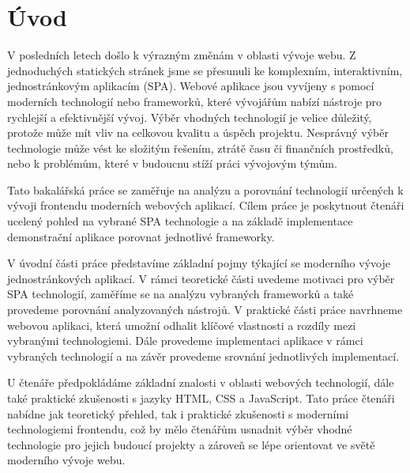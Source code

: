 \section*{Úvod}

\begin{zvyraznenyodstavec}
V posledních letech došlo k výrazným změnám v oblasti vývoje webu. 
Z jednoduchých statických stránek jsme se přesunuli ke komplexním, interaktivním, jednostránkovým aplikacím (SPA). 
Webové aplikace jsou vyvíjeny s pomocí moderních technologií nebo frameworků, které vývojářům nabízí nástroje pro rychlejší a efektivnější vývoj. 
Výběr vhodných technologií je velice důležitý, protože může mít vliv na celkovou kvalitu a úspěch projektu. 
Nesprávný výběr technologie může vést ke složitým řešením, ztrátě času či finančních prostředků, nebo k problémům, které v budoucnu stíží práci vývojovým týmům.

Tato bakalářská práce se zaměřuje na analýzu a porovnání technologií určených k vývoji frontendu moderních webových aplikací. 
Cílem práce je poskytnout čtenáři ucelený pohled na vybrané SPA technologie a na základě implementace demonstrační aplikace porovnat jednotlivé frameworky.

V úvodní části práce představíme základní pojmy týkající se moderního vývoje jednostránkových aplikací. 
V rámci teoretické části uvedeme motivaci pro výběr SPA technologií, zaměříme se na analýzu vybraných frameworků a také provedeme porovnání analyzovaných nástrojů. 
V praktické části práce navrhneme webovou aplikaci, která umožní odhalit klíčové vlastnosti a rozdíly mezi vybranými technologiemi. 
Dále provedeme implementaci aplikace v rámci vybraných technologií a na závěr provedeme srovnání jednotlivých implementací.

U čtenáře předpokládáme základní znalosti v oblasti webových technologií, dále také praktické zkušenosti s jazyky HTML, CSS a JavaScript. 
Tato práce čtenáři nabídne jak teoretický přehled, tak i praktické zkušenosti s moderními technologiemi frontendu, 
což by mělo čtenářům usnadnit výběr vhodné technologie pro jejich budoucí projekty a zároveň se lépe orientovat ve světě moderního vývoje webu.
\end{zvyraznenyodstavec}


